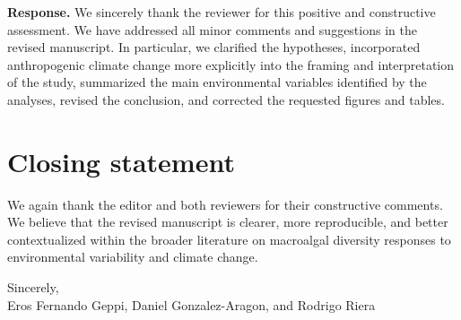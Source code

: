 \documentclass[12pt]{article}
\newcommand{\authorresponse}[1]{%
\vspace{0.3em}
\noindent\textbf{Response.} \textcolor{responsegreen}{#1}\par
\vspace{0.8em}
}
\begin{document}
\authorresponse{We sincerely thank the reviewer for this positive and constructive assessment. We have addressed all minor comments and suggestions in the revised manuscript. In particular, we clarified the hypotheses, incorporated anthropogenic climate change more explicitly into the framing and interpretation of the study, summarized the main environmental variables identified by the analyses, revised the conclusion, and corrected the requested figures and tables.}

\section{Closing statement}

\noindent We again thank the editor and both reviewers for their constructive comments. We believe that the revised manuscript is clearer, more reproducible, and better contextualized within the broader literature on macroalgal diversity responses to environmental variability and climate change.

\vspace{0.5cm}
\noindent Sincerely,\\[0.2cm]
\noindent Eros Fernando Geppi, Daniel Gonzalez-Aragon, and Rodrigo Riera
\end{document}

